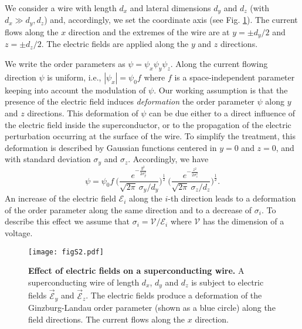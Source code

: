 \documentclass[prl,twocolumn,reprint,graphicx,showpacs,superscriptaddress,floatfix]{revtex4-1}
\newcommand{\mathE}{\mathcal{E} }
\begin{document}
We consider a wire with length $d_x$ and lateral dimensions $d_y$ and $d_z$ (with $d_x \gg d_y, d_z$) and, accordingly, we set the coordinate axis (see Fig. \ref{wire}).
The current flows along the $x$ direction and the extremes of the wire are at $y=\pm d_y/2$ and $z=\pm d_z/2$.
The electric fields are applied along the $y$ and $z$ directions.

We write the order parameters as $\psi = \psi_x \psi_y \psi_z$.
Along the current flowing direction $\psi$ is uniform, i.e., $|\psi_x| = \psi_0 f$ where $f$ is a space-independent parameter keeping into account the modulation of $\psi$.
Our working assumption is that the presence of the electric field induces \emph{deformation} the order parameter $\psi$ along  $y$ and $z$ directions.
This deformation of $\psi$ can be due either to a direct influence of the electric field inside the superconductor, or to the propagation of the electric perturbation occurring at the surface of the wire.
To simplify the treatment, this deformation is described by Gaussian functions centered in $y=0$ and $z=0$, and with standard deviation $\sigma_y$ and $\sigma_z$.
Accordingly,  we have
\begin{equation}
 \psi  = \psi_0 f ~    \Big(\frac{e^{- \frac{ y^2}{2 \sigma_y^2}}}{\sqrt{2 \pi} ~\sigma_y/d_y} \Big)^{\frac{1}{2}}  ~    \Big( \frac{e^{- \frac{ z^2}{2 \sigma_z^2}}}{\sqrt{2 \pi} ~\sigma_z/d_z}\Big)^{\frac{1}{2}} .
 \label{eq:GL-wave-function}
\end{equation}
An increase of the electric field $\mathE_i$ along the $i$-th direction leads to a deformation of the order parameter along the same direction and to a decrease of $\sigma_i$.
To describe this effect we assume that  $\sigma_i = \mathcal{V}/\mathE_i$ where $\mathcal{V}$ has the dimension of a voltage.
\begin{figure}
    \begin{center}
    \texttt{[image: figS2.pdf]}\vspace{-3mm}
       \end{center}
    \caption{{\bf Effect of electric fields on a superconducting wire.}
     A superconducting wire of length $d_x$, $d_y$ and $d_z$ is subject to electric fields $\vec{\mathE}_y$ and $\vec{\mathE}_z$. The electric fields produce a deformation of the Ginzburg-Landau order parameter (shown as a blue circle) along the field directions. 
    The current flows along the $x$ direction.  
    }  
    \label{wire}
\end{figure} 
\end{document}
